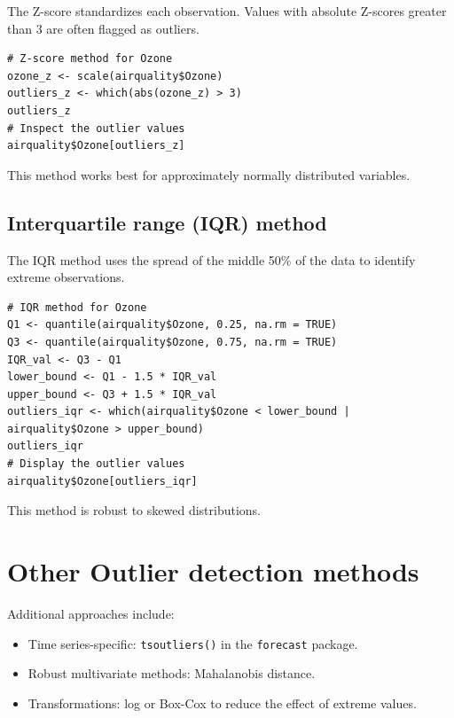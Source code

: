\documentclass[12pt,a4paper]{article}
\begin{document}
The Z-score standardizes each observation. Values with absolute Z-scores greater than 3 are often flagged as outliers.

\begin{verbatim}
# Z-score method for Ozone
ozone_z <- scale(airquality$Ozone)
outliers_z <- which(abs(ozone_z) > 3)
outliers_z
# Inspect the outlier values
airquality$Ozone[outliers_z]
\end{verbatim}

This method works best for approximately normally distributed variables.

\subsection{Interquartile range (IQR) method}

The IQR method uses the spread of the middle 50\% of the data to identify extreme observations.

\begin{verbatim}
# IQR method for Ozone
Q1 <- quantile(airquality$Ozone, 0.25, na.rm = TRUE)
Q3 <- quantile(airquality$Ozone, 0.75, na.rm = TRUE)
IQR_val <- Q3 - Q1
lower_bound <- Q1 - 1.5 * IQR_val
upper_bound <- Q3 + 1.5 * IQR_val
outliers_iqr <- which(airquality$Ozone < lower_bound | airquality$Ozone > upper_bound)
outliers_iqr
# Display the outlier values
airquality$Ozone[outliers_iqr]
\end{verbatim}

This method is robust to skewed distributions.

\section{Other Outlier detection methods}

Additional approaches include:
\begin{itemize}
    \item Time series-specific: \texttt{tsoutliers()} in the \texttt{forecast} package.
    \item Robust multivariate methods: Mahalanobis distance.
    \item Transformations: log or Box-Cox to reduce the effect of extreme values.
\end{itemize}
\end{document}
